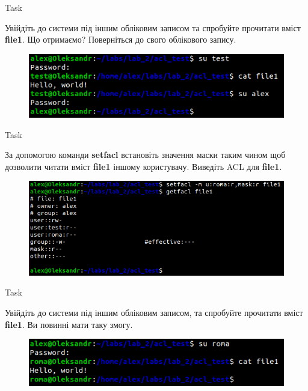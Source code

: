 \documentclass[a4paper,12pt]{article}
\newcommand{\RomanNumeralCaps}[1]{\MakeUppercase{\romannumeral #1}}
\begin{document}
    \begin{center}
        \Large{Task \RomanNumeralCaps{20}}
    \end{center}
    Увійдіть до системи під іншим обліковим записом та спробуйте прочитати вміст \textbf{file1}. Що отримаємо? Поверніться до свого облікового запису.
    \begin{figure}[h!]
        \begin{minipage}[h]{1\linewidth}
            \centering
            \includegraphics[width=0.6\linewidth]{Prt sc/Figure_20.png}  
        \end{minipage}
    \end{figure}

\newpage
    \begin{center}
        \Large{Task \RomanNumeralCaps{21}}
    \end{center}
    За допомогою команди \textbf{setfacl} встановіть значення маски таким чином щоб дозволити читати вміст \textbf{file1} іншому користувачу. Виведіть ACL для \textbf{file1}.
    \begin{figure}[h!]
        \begin{minipage}[h]{1\linewidth}
            \centering
            \includegraphics[width=0.6\linewidth]{Prt sc/Figure_21.png}  
        \end{minipage}
    \end{figure}

    \begin{center}
        \Large{Task \RomanNumeralCaps{22}}
    \end{center}
    Увійдіть до системи під іншим обліковим записом, та спробуйте прочитати вміст \textbf{file1}. Ви повинні мати таку змогу.
    \begin{figure}[h!]
        \begin{minipage}[h]{1\linewidth}
            \centering
            \includegraphics[width=0.6\linewidth]{Prt sc/Figure_22.png}  
        \end{minipage}
    \end{figure}
\end{document}
